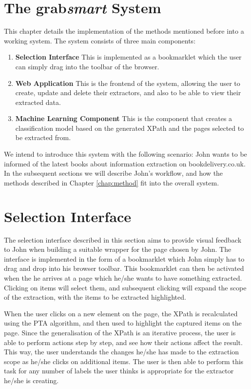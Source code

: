 \section{The grab\textit{smart} System}
\label{section:implementation}
This chapter details the implementation of the methods mentioned before into a working system.
The system consists of three main components:
\begin{enumerate}
	\item \textbf{Selection Interface}
	This is implemented as a bookmarklet which the user can simply drag into the toolbar of the browser.
	\item \textbf{Web Application}
	This is the frontend of the system, allowing the user to create, update and delete their extractors,
	and also to be able to view their extracted data.
	\item \textbf{Machine Learning Component}
	This is the component that creates a classification model based on the generated XPath and the pages selected to be extracted from.
\end{enumerate}

We intend to introduce this system with the following scenario: John wants to be informed of 
the latest books about information extraction on bookdelivery.co.uk. In the subsequent sections
we will describe John's workflow, and how the methods described in Chapter \ref{chap:method} 
fit into the overall system.

\section{Selection Interface}
The selection interface described in this section aims to provide visual feedback to John
when building a suitable wrapper for the page chosen by John. The interface is implemented
in the form of a bookmarklet which John simply has to drag and drop into his browser
toolbar. This bookmarklet can then be activated when the he arrives at a page which he/she wants
to have something extracted. Clicking on items will select them, and subsequent clicking
will expand the scope of the extraction, with the items to be extracted highlighted.


When the user clicks on a new element on the page,
the XPath is recalculated using the PTA algorithm, and then used to highlight the captured items on the page.
Since the generalisation of the XPath is an iterative process, the user is able to perform
actions step by step, and see how their actions affect the result.
This way, the user understands the changes he/she has made to the extraction scope as he/she
clicks on additional items. The user is then able to perform this task for any number of labels
the user thinks is appropriate for the extractor he/she is creating.


